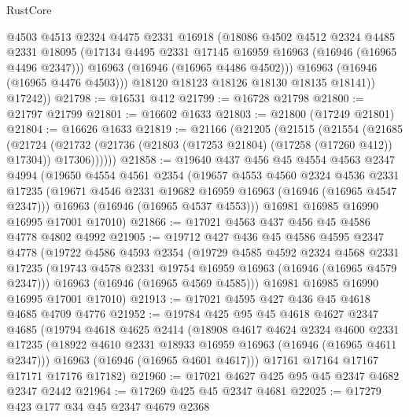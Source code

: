 \begin{lexlean}{RustCore}
\begin{coremodule}
              @4503
              @4513
              @2324
              @4475
              @2331
              @16918
              (@18086
                @4502
                @4512
                @2324
                @4485
                @2331
                @18095
                (@17134 @4495 @2331 @17145 @16959 @16963 (@16946 (@16965 @4496 @2347)))
                @16963
                (@16946 (@16965 @4486 @4502)))
              @16963
              (@16946 (@16965 @4476 @4503)))
            @18120
            @18123
            @18126
            @18130
            @18135
            @18141))
        @17242))
@21798 := @16531 @412
@21799 := @16728 @21798
@21800 := @21797 @21799
@21801 := @16602 @1633
@21803 := @21800 (@17249 @21801)
@21804 := @16626 @1633
@21819 := @21166
    (@21205
      (@21515
        (@21554
          (@21685
            (@21724
              (@21732 (@21736 (@21803 (@17253 @21804) (@17258 (@17260 @412)) @17304)) @17306))))))
@21858 := @19640
    @437
    @456
    @45
    @4554
    @4563
    @2347
    @4994
    (@19650
      @4554
      @4561
      @2354
      (@19657
        @4553
        @4560
        @2324
        @4536
        @2331
        @17235
        (@19671 @4546 @2331 @19682 @16959 @16963 (@16946 (@16965 @4547 @2347)))
        @16963
        (@16946 (@16965 @4537 @4553)))
      @16981
      @16985
      @16990
      @16995
      @17001
      @17010)
@21866 := @17021 @4563 @437 @456 @45 @4586 @4778 @4802 @4992
@21905 := @19712
    @427
    @436
    @45
    @4586
    @4595
    @2347
    @4778
    (@19722
      @4586
      @4593
      @2354
      (@19729
        @4585
        @4592
        @2324
        @4568
        @2331
        @17235
        (@19743 @4578 @2331 @19754 @16959 @16963 (@16946 (@16965 @4579 @2347)))
        @16963
        (@16946 (@16965 @4569 @4585)))
      @16981
      @16985
      @16990
      @16995
      @17001
      @17010)
@21913 := @17021 @4595 @427 @436 @45 @4618 @4685 @4709 @4776
@21952 := @19784
    @425
    @95
    @45
    @4618
    @4627
    @2347
    @4685
    (@19794
      @4618
      @4625
      @2414
      (@18908
        @4617
        @4624
        @2324
        @4600
        @2331
        @17235
        (@18922 @4610 @2331 @18933 @16959 @16963 (@16946 (@16965 @4611 @2347)))
        @16963
        (@16946 (@16965 @4601 @4617)))
      @17161
      @17164
      @17167
      @17171
      @17176
      @17182)
@21960 := @17021 @4627 @425 @95 @45 @2347 @4682 @2347 @2442
@21964 := @17269 @425 @45 @2347 @4681
@22025 := @17279
    @423
    @177
    @34
    @45
    @2347
    @4679
    @2368

\end{coremodule}
\end{lexlean}
